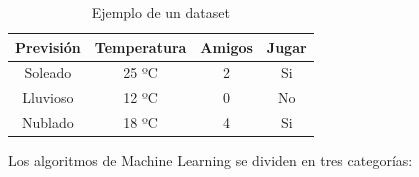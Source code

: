 \documentclass[a4paper, 12pt]{book}
\begin{document}
 \begin{table}[]
     \centering
     \begin{tabular}{| c | c | c | c |}
            \hline
          Previsión & Temperatura & Amigos & Jugar\\
          \hline
           Soleado &  25 ºC & 2 & Si \\
           \hline
           Lluvioso &  12 ºC & 0 & No\\
           \hline
           Nublado &  18 ºC & 4 & Si\\
           \hline
     \end{tabular}
     \caption{Ejemplo de un dataset}
     \label{tab:my_dataSet}
 \end{table}
 
 Los algoritmos de Machine Learning se dividen en tres categorías: 
\end{document}
